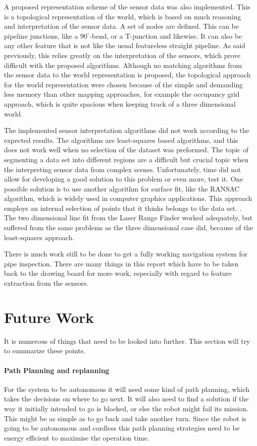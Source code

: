 A proposed representation scheme of the sensor data was also implemented. This is a
topological representation of the world, which is based on much reasoning and
interpretation of the sensor data. A set of nodes are defined. This can be pipeline
junctions, like a $90^\circ$-bend, or a T-junction and likewise. It can also be any other
feature that is not like the usual featureless straight pipeline. As said previously, this relies
greatly on the interpretation of the sensors, which prove difficult with the proposed
algorithms. Although no matching algorithms from the sensor data to the world
representation is proposed, the topological approach for the world representation were
chosen because of the simple and demanding less memory than other mapping approaches, for
example the occupancy grid approach, which is quite spacious when keeping track of a three
dimensional world. 

The implemented sensor interpretation algorithms did not work according to the expected
results. The algorithms are least-squares based algorithms, and this does not work well when
no selection of the dataset was preformed. The topic of segmenting a data set into
different regions are a difficult but crucial topic when the interpreting sensor data from
complex scenes. Unfortunately, time did not allow for developing a good solution to this
problem or even more, test it. One possible solution is to use another algorithm for surface fit, like the
RANSAC algorithm, which is widely used in computer graphics applications. This approach
employs an internal selection of points that it thinks belongs to the data set.
\cite{ransac}. The two dimensional line fit from the Laser Range Finder worked adequately,
but suffered from the same problems as the three dimensional case did, because of the
least-squares approach. 

There is much work still to be done to get a fully working navigation system for pipe
inspection. There are many things in this report which have to be taken back to the
drawing board for more work, especially with regard to feature extraction from the
sensors. 

\section{Future Work}
It is numerous of things that need to be looked into further. This section will try to 
summarize these points. 

\paragraph{Path Planning and replanning} For the system to be autonomous it will
need some kind of path planning, which takes the decisions on where to go next. It will
also need to find a solution if the way it initially intended to go is blocked, or else the
robot might fail its mission. This might be as simple as to go back and take
another turn. Since the robot is going to be autonomous and cordless this path planning
strategies need to be energy efficient to maximise the operation time. 


